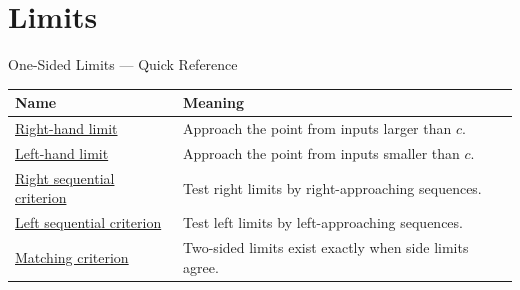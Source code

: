 
\section{Limits}

\begin{toolkitbox}{One-Sided Limits --- Quick Reference}
\small
\begin{tabular}{l l}
\toprule
\textbf{Name} & \textbf{Meaning}\\
\midrule
\hyperref[def:right-hand-limit]{Right-hand limit} & Approach the point from inputs larger than $c$.\\
\hyperref[def:left-hand-limit]{Left-hand limit} & Approach the point from inputs smaller than $c$.\\
\hyperref[thm:sequential-criterion-right-hand-limit]{Right sequential criterion} & Test right limits by right-approaching sequences.\\
\hyperref[cor:sequential-criterion-left-hand-limit]{Left sequential criterion} & Test left limits by left-approaching sequences.\\
\hyperref[thm:two-sided-limit-iff-matching-one-sided-limits]{Matching criterion} & Two-sided limits exist exactly when side limits agree.\\
\bottomrule
\end{tabular}
\end{toolkitbox}


